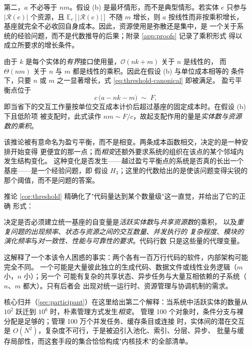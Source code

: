 第二，$a$ 不必等于 $nm$。假设 (b) 是最坏情形，而不是典型情形。若实体 $e$ 只参与
$|\mathcal{R}(e)|$ 个资源，且 $\mathbb{E}_e[|\mathcal{R}(e)|]$ 不随 $m$ 增长，则 $a$
按线性而非按乘积增长，基座就完全不必收回自身成本。因此，资源使用是弥散还是集中，是
一个关于系统的经验问题，而不是代数推导的后果；附录 \ref{app:proofs} 记录了乘积形式
得以成立所要求的增长条件。

\begin{corollary}[盈亏平衡阈值]\label{cor:threshold}
由于 $k$ 是每个实体的\emph{有界}接口使用量，$\mathcal{O}(nk + m)$ 关于 $n$ 是线性的，
而 $\Theta(nm)$ 关于 $n$ 与 $m$ 都是线性的乘积。因此在假设 (b) 与单位成本相等的
条件下，只要 $n$ 或 $m$ 之一显著增长，式 \eqref{eq:threshold-canonical} 即被满足。
盈亏平衡点位于
\[
c\,\bigl(a - n k - m\bigr) \;\sim\; F,
\]
即当省下的交互工作量按单位交互成本计价后超过基座的固定成本时。在假设 (b) 下且低阶项
被支配时，此式读作 $n m \sim F/c$，故起支配作用的量是\emph{实体数与资源数的乘积}。
\end{corollary}

该推论被有意命名为盈亏平衡，而不是相变。两条成本函数相交，决定的是一种安排开始变得
更便宜的那一点；而\emph{相变}还额外要求系统的组织在该点的某个邻域内发生结构变化。
这种变化是否发生——越过盈亏平衡点的系统是否真的长出一个基座——是一个经验问题，即
假设 $H_3$；这里的代数给出的是使该问题变得尖锐的那个阈值，而不是问题的答案。

推论 \ref{cor:threshold} 精确化了"代码量达到某个数量级"这一直觉，并给出了它的正确
形式：

\begin{principle}[阈值不是代码行数]\label{pr:notloc}
决定是否必须建立统一基座的自变量是\emph{活跃实体数}与\emph{共享资源数}的乘积，
以及\emph{重复问题的出现频率}、\emph{状态与资源之间的交互数量}、\emph{并发执行的
复杂程度}、\emph{模块的演化频率}与\emph{对一致性、性能与可靠性的要求}。代码行数
只是这些量的代理变量。
\end{principle}

这解释了一个本该令人困惑的事实：两个各有一百万行代码的软件，内部架构可能完全不同。
一个可能是大量彼此独立的生成代码、数据文件或线性业务逻辑（$m$ 小，$n$ 小）；另一个
可能有复杂的共享状态、异步任务与大量互相依赖的子系统（$n$、$m$ 都大）。只有后者会
出现对统一运行时、资源管理与协调机制的需求。

核心归并（\ref{sec:participant}）在这里给出第二个解释：当系统中活跃实体的数量从
$10^{2}$ 跃迁到 $10^{6}$ 时，朴素管理方式发生\emph{相变}。
管理 100 个对象时，条件分支与裸分配是足够的；管理 100 万个并发任务、缓存条目或连接
时，实体间的潜在交互是 $O(N^{2})$，复杂度不可行，于是被迫引入池化、索引、分层、异步、
批量与缓存局部性，而这套手段的集合恰恰构成"内核技术"的全部清单。

